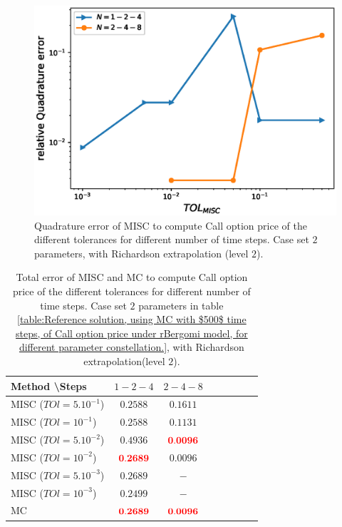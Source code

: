 \documentclass[11pt]{article}
\begin{document}
		
		\begin{figure}[h!]
			\centering
			\includegraphics[width=0.7\linewidth]{./figures/rBergomi_MISC_quadratre_error/vs_TOL/set2/relative_quad_error_wrt_MISC_TOL_set2_rich_level2_linear}
			
			
			\caption{Quadrature error of MISC to compute Call option price of the different tolerances for different number of time steps. Case  set $2$ parameters, with Richardson extrapolation (level $2$).}
			\label{fig:Quadrature_error_set2_rich_linear}
		\end{figure}
		
		
		\begin{table}[!h]
			\centering
			\begin{tabular}{l*{6}{c}r}
				Method \textbackslash  Steps            & $1-2-4$ & $2-4-8$  \\
				\hline
				MISC ($TOl=5.10^{-1}$)  & $\mathbf{ 0.2588
				}$ & $\mathbf{ 0.1611}$  \\
				MISC ($TOl=10^{-1}$)  & $\mathbf{ 0.2588
				}$ & $\mathbf{ 0.1131}$ \\
				MISC ($TOl=5.10^{-2}$)  & $\mathbf{   0.4936
				}$ & $\mathbf{{\color{red} 0.0096} }$  \\
				MISC ($TOl=10^{-2}$)  & $\mathbf{ {\color{red}0.2689}}$ & $\mathbf{ 0.0096 }$    \\	
				MISC ($TOl=5.10^{-3}$)  & $\mathbf{ 0.2689}$ & $\mathbf{-}$   \\
				MISC ($TOl=10^{-3}$)  & $\mathbf{ 0.2499}$ & $\mathbf{-}$   \\
				\hline
				MC   & $\mathbf{{\color{red}0.2689}}$  & $\mathbf{{\color{red} 0.0096}}$    \\
				\hline
			\end{tabular}
			\caption{Total  error of MISC and MC to compute Call option price of the different tolerances for different number of time steps. Case set $2$ parameters in table \ref{table:Reference solution, using MC with $500$ time steps, of Call option price under rBergomi model, for different parameter constellation.}, with Richardson extrapolation(level $2$).}
			\label{Total  error of MISC and MC to compute Call option price of the different tolerances for different number of time steps. Case set $2$ parameters, with Richardson extrapolation(level $2$). The numbers between parentheses are the corresponding absolute errors,linear}
		\end{table}
		
\end{document}
